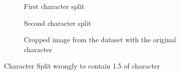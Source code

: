 \begin{figure}[ht]
  \centering
  \begin{subfigure}{0.49\textwidth}
    \centering
    \caption{First character split}
    \label{fig:results:15:s1}
  \end{subfigure}
  \begin{subfigure}{0.49\textwidth}
    \centering
    \caption{Second character split}
    \label{fig:results:15:s2}
  \end{subfigure}
    \begin{subfigure}{\textwidth}
    \centering
    \caption{Cropped image from the dataset with the original character}
    \label{fig:results:15:o}
  \end{subfigure}
  \caption{Character Split wrongly to contain 1.5 of character}
  \label{fig:results:15}
\end{figure}

